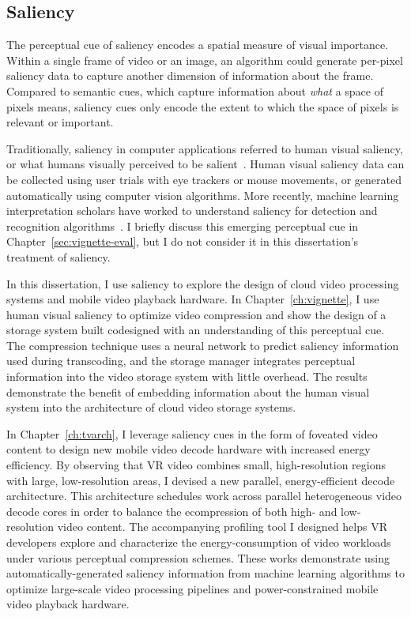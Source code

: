\subsection{Saliency}
The perceptual cue of saliency encodes a spatial measure of visual importance.
Within a single frame of video or an image, an algorithm could generate per-pixel saliency data to capture another dimension of information about the frame.
Compared to semantic cues, which capture information about \emph{what} a space of pixels means, saliency cues only encode the extent to which the space of pixels is relevant or important.

Traditionally, saliency in computer applications referred to human visual saliency, or what humans visually perceived to be salient~\cite{itti1998model}.
Human visual saliency data can be collected using user trials with eye trackers or mouse movements, or generated automatically using computer vision algorithms.
More recently, machine learning interpretation scholars have worked to understand saliency for detection and recognition algorithms~\cite{bylinskii2016saliency}.
I briefly discuss this emerging perceptual cue in Chapter~\ref{sec:vignette-eval}, but I do not consider it in this dissertation's treatment of saliency.

In this dissertation, I use saliency to explore the design of cloud video processing systems and mobile video playback hardware.
In Chapter~\ref{ch:vignette}, I use human visual saliency to optimize video compression and show the design of a storage system built codesigned with an understanding of this perceptual cue.
The compression technique uses a neural network to predict saliency information used during transcoding, and the storage manager integrates perceptual information into the video storage system with little overhead.
The results demonstrate the benefit of embedding information about the human visual system into the architecture of cloud video storage systems.

In Chapter~\ref{ch:tvarch}, I leverage saliency cues in the form of foveated video content to design new mobile video decode hardware with increased energy efficiency.
By observing that VR video combines small, high-resolution regions with large, low-resolution areas, I devised a new parallel, energy-efficient decode architecture.
This architecture schedules work across parallel heterogeneous video decode cores in order to balance the ecompression of both high- and low-resolution video content.
The accompanying profiling tool I designed helps VR developers explore and characterize the energy-consumption of video workloads under various perceptual compression schemes.
These works demonstrate using automatically-generated saliency information from machine learning algorithms to optimize large-scale video processing pipelines and power-constrained mobile video playback hardware.

